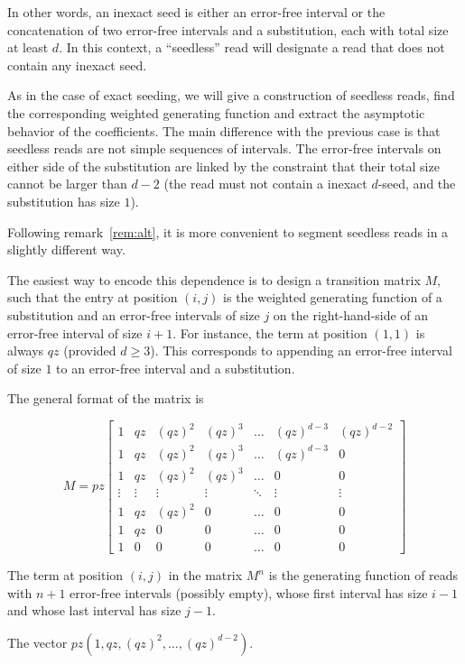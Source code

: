 \documentclass{article}
\begin{document}
In other words, an inexact seed is either an error-free interval or the
concatenation of two error-free intervals and a substitution, each with
total size at least $d$. In this context, a ``seedless'' read will
designate a read that does not contain any inexact seed.

As in the case of exact seeding, we will give a construction of seedless
reads, find the corresponding weighted generating function and extract the
asymptotic behavior of the coefficients. The main difference with the
previous case is that seedless reads are not simple sequences of
intervals. The error-free intervals on either side of the substitution are
linked by the constraint that their total size cannot be larger than $d-2$
(the read must not contain a inexact $d$-seed, and the substitution has
size $1$).

Following remark~\ref{rem:alt}, it is more convenient to segment seedless
reads in a slightly different way.

The easiest way to encode this dependence is to design a transition matrix
$M$, such that the entry at position $(i,j)$ is the weighted generating
function of a substitution and an error-free intervals of size $j$ on the
right-hand-side of an error-free interval of size $i+1$. For instance, the
term at position $(1,1)$ is always $qz$ (provided $d \geq 3$). This
corresponds to appending an error-free interval of size $1$ to an
error-free interval and a substitution.

The general format of the matrix is

\begin{equation}
M = pz\left[
\begin{matrix}
1 & qz  & (qz)^2 & (qz)^3 & \ldots & (qz)^{d-3} & (qz)^{d-2} \\
1 & qz  & (qz)^2 & (qz)^3 & \ldots & (qz)^{d-3} & 0          \\
1 & qz  & (qz)^2 & (qz)^3 & \ldots & 0          & 0          \\
\vdots & \vdots & \vdots & \vdots & \ddots & \vdots & \vdots \\
1 & qz  & (qz)^2 & 0      & \ldots & 0          & 0          \\
1 & qz  & 0      & 0      & \ldots & 0          & 0          \\
1 & 0   & 0      & 0      & \ldots & 0          & 0
\end{matrix}
\right]
\end{equation}

The term at position $(i,j)$ in the matrix $M^n$ is the generating
function of reads with $n+1$ error-free intervals (possibly empty), whose
first interval has size $i-1$ and whose last interval has size $j-1$.

The vector $pz(1, qz, (qz)^2, \ldots, (qz)^{d-2})$.







\end{document}
